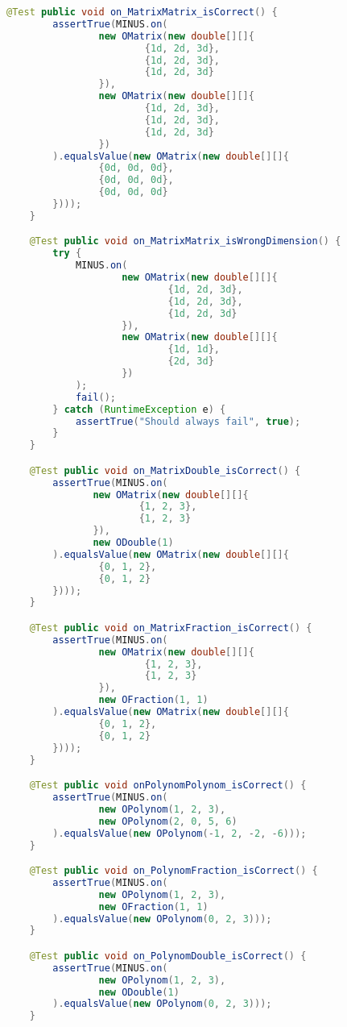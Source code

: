 \begin{lstlisting}[caption=MinusTest (Falk),label=list:MinusTest,language=Java]
    @Test public void on_MatrixMatrix_isCorrect() {
        assertTrue(MINUS.on(
                new OMatrix(new double[][]{
                        {1d, 2d, 3d},
                        {1d, 2d, 3d},
                        {1d, 2d, 3d}
                }),
                new OMatrix(new double[][]{
                        {1d, 2d, 3d},
                        {1d, 2d, 3d},
                        {1d, 2d, 3d}
                })
        ).equalsValue(new OMatrix(new double[][]{
                {0d, 0d, 0d},
                {0d, 0d, 0d},
                {0d, 0d, 0d}
        })));
    }

    @Test public void on_MatrixMatrix_isWrongDimension() {
        try {
            MINUS.on(
                    new OMatrix(new double[][]{
                            {1d, 2d, 3d},
                            {1d, 2d, 3d},
                            {1d, 2d, 3d}
                    }),
                    new OMatrix(new double[][]{
                            {1d, 1d},
                            {2d, 3d}
                    })
            );
            fail();
        } catch (RuntimeException e) {
            assertTrue("Should always fail", true);
        }
    }

    @Test public void on_MatrixDouble_isCorrect() {
        assertTrue(MINUS.on(
               new OMatrix(new double[][]{
                       {1, 2, 3},
                       {1, 2, 3}
               }),
               new ODouble(1)
        ).equalsValue(new OMatrix(new double[][]{
                {0, 1, 2},
                {0, 1, 2}
        })));
    }

    @Test public void on_MatrixFraction_isCorrect() {
        assertTrue(MINUS.on(
                new OMatrix(new double[][]{
                        {1, 2, 3},
                        {1, 2, 3}
                }),
                new OFraction(1, 1)
        ).equalsValue(new OMatrix(new double[][]{
                {0, 1, 2},
                {0, 1, 2}
        })));
    }

    @Test public void onPolynomPolynom_isCorrect() {
        assertTrue(MINUS.on(
                new OPolynom(1, 2, 3),
                new OPolynom(2, 0, 5, 6)
        ).equalsValue(new OPolynom(-1, 2, -2, -6)));
    }

    @Test public void on_PolynomFraction_isCorrect() {
        assertTrue(MINUS.on(
                new OPolynom(1, 2, 3),
                new OFraction(1, 1)
        ).equalsValue(new OPolynom(0, 2, 3)));
    }

    @Test public void on_PolynomDouble_isCorrect() {
        assertTrue(MINUS.on(
                new OPolynom(1, 2, 3),
                new ODouble(1)
        ).equalsValue(new OPolynom(0, 2, 3)));
    }


\end{lstlisting}
